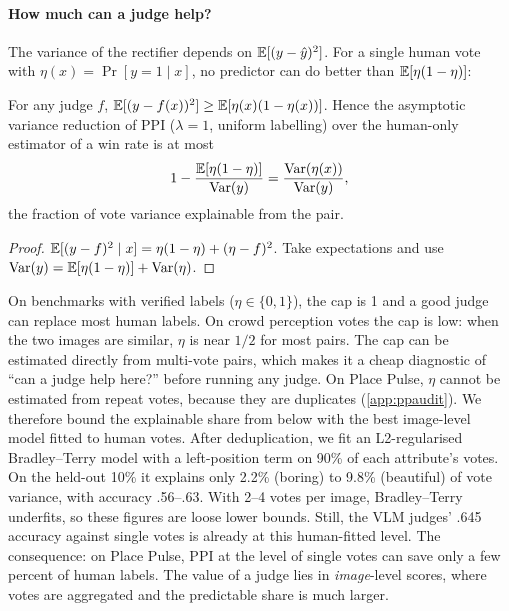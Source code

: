 \paragraph{How much can a judge help?}
The variance of the rectifier depends on $\mathbb{E}[(y-\hat y)^2]$. For a single human vote with $\eta(x)=\Pr[y=1\mid x]$, no predictor can do better than $\mathbb{E}[\eta(1-\eta)]$:
\begin{proposition}\label{prop:cap}
For any judge $f$, $\mathbb{E}[(y-f(x))^2]\ge\mathbb{E}[\eta(x)(1-\eta(x))]$. Hence the asymptotic variance reduction of PPI ($\lambda=1$, uniform labelling) over the human-only estimator of a win rate is at most
\begin{equation}
  1-\frac{\mathbb{E}[\eta(1-\eta)]}{\mathrm{Var}(y)}=\frac{\mathrm{Var}(\eta(x))}{\mathrm{Var}(y)},
\end{equation}
the fraction of vote variance explainable from the pair.
\end{proposition}
\begin{proof}
$\mathbb{E}[(y-f)^2\mid x]=\eta(1-\eta)+(\eta-f)^2$. Take expectations and use $\mathrm{Var}(y)=\mathbb{E}[\eta(1-\eta)]+\mathrm{Var}(\eta)$.
\end{proof}
\noindent On benchmarks with verified labels ($\eta\in\{0,1\}$), the cap is 1 and a good judge can replace most human labels.
On crowd perception votes the cap is low: when the two images are similar, $\eta$ is near $1/2$ for most pairs.
The cap can be estimated directly from multi-vote pairs, which makes it a cheap diagnostic of ``can a judge help here?'' before running any judge.
On Place Pulse, $\eta$ cannot be estimated from repeat votes, because they are duplicates (\cref{app:ppaudit}). We therefore bound the explainable share from below with the best image-level model fitted to human votes.
After deduplication, we fit an L2-regularised Bradley--Terry model with a left-position term on 90\% of each attribute's votes. On the held-out 10\% it explains only 2.2\% (boring) to 9.8\% (beautiful) of vote variance, with accuracy .56--.63.
With 2--4 votes per image, Bradley--Terry underfits, so these figures are loose lower bounds. Still, the VLM judges' .645 accuracy against single votes is already at this human-fitted level.
The consequence: on Place Pulse, PPI at the level of single votes can save only a few percent of human labels. The value of a judge lies in \emph{image}-level scores, where votes are aggregated and the predictable share is much larger.


